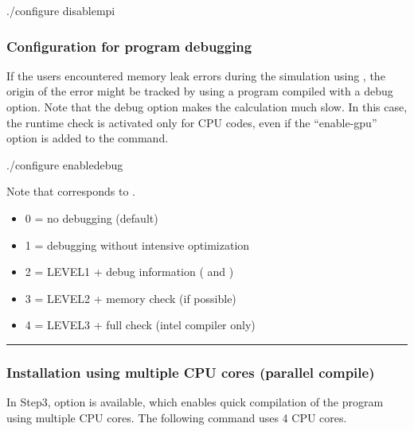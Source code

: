 \documentclass[a4paper,11pt,oneside,english]{sphinxmanual}
\begin{document}
\begin{sphinxVerbatim}[commandchars=\\\{\}]
\PYGZdl{} ./configure \PYGZhy{}\PYGZhy{}disable\PYGZhy{}mpi
\end{sphinxVerbatim}


\subsubsection{Configuration for program debugging}
\label{\detokenize{01_Getting_Started:configuration-for-program-debugging}}
If the users encountered memory leak errors during the simulation using ,
the origin of the error might be tracked by using a program compiled with a debug option.
Note that the debug option makes the calculation much slow.
In this case, the runtime check is activated only for CPU codes,
even if the “\textendash{}enable-gpu” option is added to the command.

\begin{sphinxVerbatim}[commandchars=\\\{\}]
\PYGZdl{} ./configure \PYGZhy{}\PYGZhy{}enable\PYGZhy{}debug
\end{sphinxVerbatim}

Note that  corresponds to .
\begin{itemize}
\item {} 
0 = no debugging (default)

\item {} 
1 = debugging without intensive optimization

\item {} 
2 = LEVEL1 + debug information ( and )

\item {} 
3 = LEVEL2 + memory check (if possible)

\item {} 
4 = LEVEL3 + full check (intel compiler only)

\end{itemize}


\bigskip\hrule\bigskip



\subsubsection{Installation using multiple CPU cores (parallel compile)}
\label{\detokenize{01_Getting_Started:installation-using-multiple-cpu-cores-parallel-compile}}
In Step3,  option is available, which enables quick compilation
of the program using multiple CPU cores. The following command uses 4 CPU cores.
\end{document}
